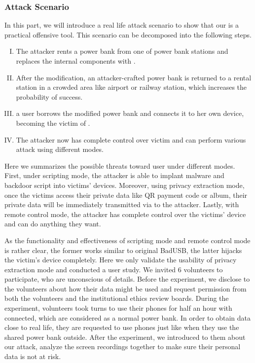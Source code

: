 \subsubsection{Attack Scenario}

In this part, we will introduce a real life attack scenario to show that our
\tool is a practical offensive tool.  This scenario can be decomposed into the
following steps.

\begin{enumerate}[I. ]
	\item The attacker rents a power bank from one of power bank stations and replaces the internal components with \tool.
	\item After the modification, an attacker-crafted power bank is returned to a rental station in a crowded area like airport or railway station, which increases the probability of success.
	\item a user borrows the modified power bank and connects it to her own device, becoming the victim of \tool.
	\item The attacker now has complete control over victim and can perform various attack using different modes.
\end{enumerate}

Here we summarizes the possible threats toward user under different modes. 
First, under scripting mode, the attacker is able to implant malware and backdoor script into victims' devices. Moreover, using privacy extraction mode, once the victims access their private data like QR payment  code or album, their private data will be immediately transmitted via \tool to the attacker. Lastly, with remote control mode, the attacker has complete control over the victims' device and can do anything they want.

As the functionality and effectiveness of scripting mode and remote control mode is rather clear, the former works similar to original BadUSB, the latter hijacks the victim's device completely.
Here we only validate the usability of privacy extraction mode and conducted a user study.
We invited 6 volunteers to participate, who are unconscious of \tool details.
Before the experiment, we disclose to the volunteers about how their data might be used and request permission from both the volunteers and the institutional ethics review boards.
During the experiment, volunteers took turns to use their phones for half an hour with \tool connected, which are considered as a normal power bank.
In order to obtain data close to real life, they are requested to use phones just like when they use the shared power bank outside.
After the experiment, we introduced to them about our attack, analyze the screen recordings together to make sure their personal data is not at risk.


